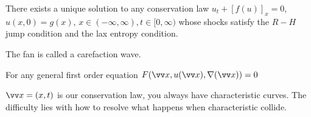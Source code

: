   \thm There exists a unique solution to any conservation law $u_t + [f(u)]_x = 0$, $u(x, 0) = g(x)$, $x \in (-\infty, \infty), t \in [0, \infty)$ whose shocks satisfy the $R-H$ jump condition and the lax entropy condition.

  \note The fan is called a carefaction wave.

  For any general first order equation $F(\vv x, u(\vv x), \grad(\vv x)) = 0$

  $\vv x = (x, t)$ is our conservation law, you always have characteristic curves. The difficulty lies with how to resolve what happens when characteristic collide.



